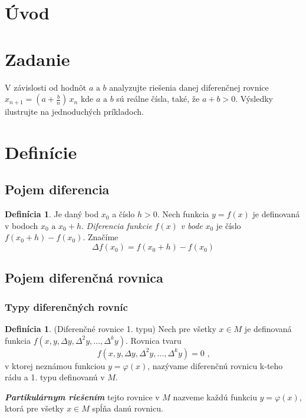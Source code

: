 \documentclass[a4paper,10pt]{article}
\theoremstyle{plain}
\theoremstyle{definition}
\newtheorem{defin}[thm]{Definícia}
\begin{document}
\newpage

\tableofcontents

\newpage
\section{Úvod}


\newpage
\section{Zadanie}

V závislosti od hodnôt $ a \text{ a } b $
analyzujte riešenia danej diferenčnej rovnice
$x_{n+1}=\left(a+{\frac{b}{n}}\right)\,x_{n}$
kde $ a \text{ a } b $ sú reálne čísla, také, že $ a + b > 0$. Výsledky ilustrujte na jednoduchých príkladoch. 

\section{Definície}
\subsection{Pojem diferencia}

\begin{defin}
Je daný bod $x_{0}$ a číslo $h > 0$. Nech funkcia $y = f(x)$ je 
definovaná v bodoch $x_{0} \text{ a } x_{0} + h$. \textit{Diferencia funkcie }$f(x)$\textit{ v bode }$x_{0}$
je číslo $f(x_{0} + h) - f(x_{0})$. Značíme
$$\Delta f(x_{0}) = f(x_{0} + h) - f(x_{0})$$
\end{defin}
\subsection{Pojem diferenčná rovnica}
\subsubsection{Typy diferenčných rovníc}

\begin{defin}
(Diferenčné rovnice 1. typu) 
Nech pre všetky $x \in M$ je
definovaná funkcia $f(x, y, \Delta y, \Delta ^{2}y, \ldots, \Delta ^{k}y)$. Rovnica tvaru
$$f(x, y, \Delta y, \Delta ^{2}y, \ldots, \Delta ^{k}y) = 0 \text{ ,}$$
v ktorej neznámou funkciou $y = \varphi(x)$, nazývame diferenčnú rovnicu k-teho 
rádu a 1. typu definovanú v $M$.
\end{defin}

\textbf{\textit{Partikulárnym riešením}} tejto rovnice v $M$ nazveme každú funkciu
$y = \varphi(x)$, ktorá pre všetky $x \in M$ spĺňa danú rovnicu.
\end{document}
